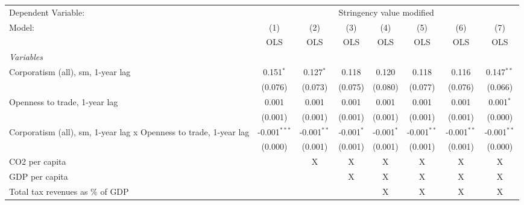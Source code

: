 
\begingroup
\centering
\begin{tabular}{lccccccc}
   \toprule
   Dependent Variable: & \multicolumn{7}{c}{Stringency value modified}\\
   Model:                                                            & (1)            & (2)           & (3)          & (4)          & (5)           & (6)           & (7)\\  
                                                                     &  OLS           & OLS           & OLS          & OLS          & OLS           & OLS           & OLS\\  
   \midrule
   \emph{Variables}\\
   Corporatism (all), sm, 1-year lag                                 & 0.151$^{*}$    & 0.127$^{*}$   & 0.118        & 0.120        & 0.118         & 0.116         & 0.147$^{**}$\\   
                                                                     & (0.076)        & (0.073)       & (0.075)      & (0.080)      & (0.077)       & (0.076)       & (0.066)\\   
   Openness to trade, 1-year lag                                     & 0.001          & 0.001         & 0.001        & 0.001        & 0.001         & 0.001         & 0.001$^{*}$\\   
                                                                     & (0.001)        & (0.001)       & (0.001)      & (0.001)      & (0.001)       & (0.001)       & (0.000)\\   
   Corporatism (all), sm, 1-year lag x Openness to trade, 1-year lag & -0.001$^{***}$ & -0.001$^{**}$ & -0.001$^{*}$ & -0.001$^{*}$ & -0.001$^{**}$ & -0.001$^{**}$ & -0.001$^{**}$\\   
                                                                     & (0.000)        & (0.001)       & (0.001)      & (0.001)      & (0.001)       & (0.001)       & (0.000)\\   
   CO2 per capita                                                    &                & X             & X            & X            & X             & X             & X\\  
   GDP per capita                                                    &                &               & X            & X            & X             & X             & X\\  
   Total tax revenues as \% of GDP                                   &                &               &              & X            & X             & X             & X\\  

\end{tabular}
